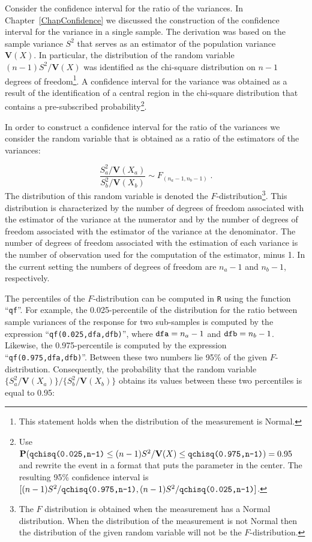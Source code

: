 \documentclass[
]{krantz}
\newcommand{\Prob}{\mathbf{P}}
\newcommand{\Var}{\mathbf{V}}
\theoremstyle{definition}
\theoremstyle{definition}
\theoremstyle{definition}
\theoremstyle{remark}
\begin{document}
Consider the confidence interval for the ratio of the variances. In
Chapter~\ref{ChapConfidence} we discussed the construction of the
confidence interval for the variance in a single sample. The derivation
was based on the sample variance \(S^2\) that serves as an estimator of
the population variance \(\Var(X)\). In particular, the distribution of
the random variable \((n-1)S^2/\Var(X)\) was identified as the chi-square
distribution on \(n-1\) degrees of freedom\footnote{This statement holds when the distribution of the measurement is
  Normal.}. A confidence interval for
the variance was obtained as a result of the identification of a central
region in the chi-square distribution that contains a pre-subscribed
probability\footnote{Use
  \(\Prob(\mbox{\texttt{qchisq(0.025,n-1)}} \leq (n-1)S^2/\Var(X) \leq \mbox{\texttt{qchisq(0.975,n-1)}}) = 0.95\)
  and rewrite the event in a format that puts the parameter in the
  center. The resulting 95\% confidence interval is
  \([(n-1)S^2/\mbox{\texttt{qchisq(0.975,n-1)}},(n-1)S^2/\mbox{\texttt{qchisq(0.025,n-1)}}]\).}.

In order to construct a confidence interval for the ratio of the
variances we consider the random variable that is obtained as a ratio of
the estimators of the variances:

\[\frac{S_a^2/\Var(X_a)}{S^2_b/\Var(X_b)} \sim F_{(n_a-1,n_b-1)}\;.\]
The distribution of this random variable is denoted the
\(F\)-distribution\footnote{The \(F\) distribution is obtained when the measurement has a Normal
  distribution. When the distribution of the measurement is not Normal
  then the distribution of the given random variable will not be the
  \(F\)-distribution.}. This distribution is characterized by the number
of degrees of freedom associated with the estimator of the variance at
the numerator and by the number of degrees of freedom associated with
the estimator of the variance at the denominator. The number of degrees
of freedom associated with the estimation of each variance is the number
of observation used for the computation of the estimator, minus 1. In
the current setting the numbers of degrees of freedom are \(n_a-1\) and
\(n_b-1\), respectively.

The percentiles of the \(F\)-distribution can be computed in \texttt{R} using the
function ``\texttt{qf}''. For example, the 0.025-percentile of the distribution
for the ratio between sample variances of the response for two
sub-samples is computed by the expression ``\texttt{qf(0.025,dfa,dfb)}'', where
\(\mbox{\texttt{dfa}} = n_a - 1\) and \(\mbox{\texttt{dfb}} = n_b - 1\).
Likewise, the 0.975-percentile is computed by the expression
``\texttt{qf(0.975,dfa,dfb)}''. Between these two numbers lie 95\% of the given
\(F\)-distribution. Consequently, the probability that the random variable
\(\{S_a^2/\Var(X_a)\}/\{S_b^2/\Var(X_b)\}\) obtains its values between
these two percentiles is equal to 0.95:
\end{document}
